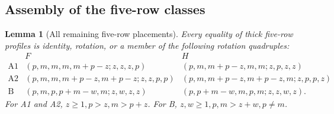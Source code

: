 \documentclass[11pt,a4paper]{amsart}
\numberwithin{equation}{section}
\theoremstyle{plain}
\newtheorem{lemma}[theorem]{Lemma}
\theoremstyle{definition}
\begin{document}
\subsection{Assembly of the five-row classes}

\begin{lemma}[All remaining five-row placements]
\label{lem:staircase-thick-classification}
Every equality of thick five-row profiles is identity, rotation, or a
member of the following rotation quadruples:
\begin{equation}\label{eq:thick-templates}
\begin{array}{c|c|c}
 &F&H\\\hline
\mathrm{A1}&(p,m,m,m,m+p-z;z,z,z,p)&(p,m,m+p-z,m,m;z,p,z,z)\\
\mathrm{A2}&(p,m,m,m+p-z,m+p-z;z,z,p,p)&(p,m,m+p-z,m+p-z,m;z,p,p,z)\\
\mathrm{B}&(p,m,p,p+m-w,m;z,w,z,z)&(p,p+m-w,m,p,m;z,z,w,z).
\end{array}
\end{equation}
For A1 and A2, \(z\ge1,p>z,m>p+z\).  For B,
\(z,w\ge1,p,m>z+w,p\ne m\).
\end{lemma}
\end{document}
